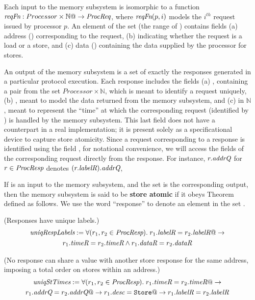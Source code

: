 Each input to the memory subsystem is isomorphic to a function
$\textit{reqFn} : Processor \times \mathbb{N} @-> \textit{ProcReq}$, where $\textit{reqFn}(p, i)$ models the
$i^{th}$ request issued by processor $p$. An element of the set \Request{} (the
range of \reqFn{}) contains fields (a) address (\addrQ) corresponding to
the request, (b) \desc{} indicating whether the request is a load or a store,
and (c) data (\dataQ) containing the data supplied by the processor for stores.

An output of the memory subsystem is a set \Response{} of exactly the responses generated
in a particular protocol execution.  Each response includes the fields
(a) , containing a pair from the set
$Processor \times \mathbb{N}$, which is meant to identify a request uniquely, (b)
\dataR, meant to model the data returned from the memory subsystem, and (c)
\timeR{} in $\mathbb{N}$, meant to represent the ``time'' at which
the corresponding request (identified by ) is handled by the memory
subsystem. This last field does not have a counterpart in a real implementation; it is
present solely as a specificational device to capture store atomicity. Since a
request corresponding to a response is identified using the field , for
notational convenience, we will access the fields of the corresponding request
directly from the response. For instance, $r.\textit{addrQ}$ for $r \in \textit{ProcResp}$
denotes $(r.\textit{labelR}).\textit{addrQ}$, \etc

If \reqFn{} is an input to the memory subsystem, and the set \Response{} is the
corresponding output, then the memory subsystem is said to be \textbf{store atomic} if it
obeys Theorem  defined as follows. We use the word
``response'' to denote an element in the set \Response{}.
%
\begin{defn} (Responses have unique labels.)
\small
\begin{multline*}
\textit{uniqRespLabels} := \forall (r_1, r_2 \in \textit{ProcResp}). \;
r_1.\textit{labelR} = r_2.\textit{labelR} @-> \\ r_1.\textit{timeR} = r_2.\textit{timeR} \wedge
r_1.\textit{dataR} = r_2.\textit{dataR}
\end{multline*}
\label{uniqRespLabels}
\end{defn}

\vspace{-.3in}

\begin{defn} (No response can share a \timeR{} value with another store
response for the same address, imposing a total order on stores within an address.)
\small
\begin{multline*}
\textit{uniqStTimes} := 
\forall (r_1, r_2 \in \textit{ProcResp}). \;
r_1.\textit{timeR} = r_2.\textit{timeR} @-> \\
r_1.\textit{addrQ} = r_2.\textit{addrQ} @->
r_1.\textit{desc} = \texttt{Store} @->
r_1.\textit{labelR} = r_2.\textit{labelR}
\end{multline*}
\label{uniqStTimes}
\end{defn}

